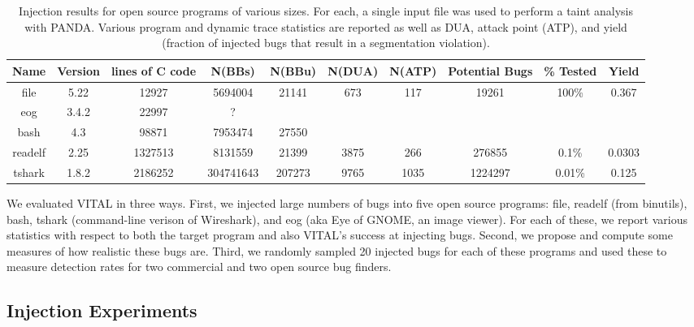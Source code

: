
\label{section:results}

\begin{table}[t!]
\centering
\begin{tabular}{c|c|c|c|c|c|c|c|c|c} 
Name    & Version & lines of C code & N(BBs)     & N(BBu)   & N(DUA)  & N(ATP) & Potential Bugs & \% Tested & Yield \\\hline
file    & 5.22    & 12927           & 5694004    & 21141    & 673     & 117    & 19261          & 100\%     & 0.367  \\
eog     & 3.4.2   & 22997           & ?          &          &         &        &                &           & \\
bash    & 4.3     & 98871           & 7953474    & 27550    &         &        &                &           & \\
readelf & 2.25    & 1327513         & 8131559    & 21399    & 3875    & 266    & 276855         & 0.1\%     & 0.0303 \\
tshark  & 1.8.2   & 2186252         & 304741643  & 207273   & 9765    & 1035   & 1224297        & 0.01\%    & 0.125 \\
\end{tabular}
\caption{Injection results for open source programs of various sizes.
For each, a single input file was used to perform a taint analysis with PANDA.
Various program and dynamic trace statistics are reported as well as DUA, attack point (ATP), and yield (fraction of injected bugs that result in a segmentation violation).}
\end{table}



We evaluated VITAL in three ways.
First, we injected large numbers of bugs into five open source programs: file, readelf (from binutils), bash, tshark (command-line verison of Wireshark), and eog (aka Eye of GNOME, an image viewer).
For each of these, we report various statistics with respect to both the target program and also VITAL's success at injecting bugs.
Second, we propose and compute some measures of how realistic these bugs are.
Third, we randomly sampled 20 injected bugs for each of these programs and used these to measure detection rates for two commercial and two open source bug finders.

\subsection{Injection Experiments}



